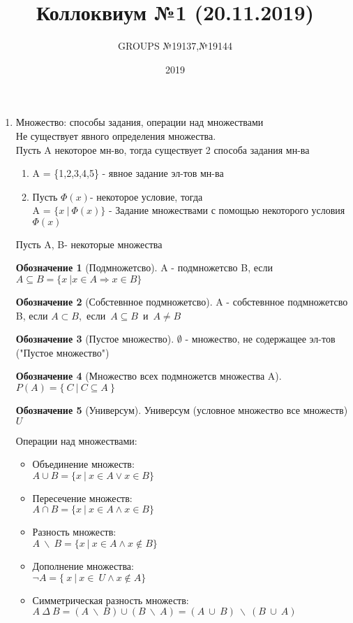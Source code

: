 \documentclass{article}
\title{ Коллоквиум №1 (20.11.2019) }
\author{GROUPS №19137,№19144}
\date{2019\\}
\theoremstyle{definition}
\newtheorem*{name}{Обозначение}
\begin{document}
  \maketitle
  \begin{enumerate}
    \item Множество: способы задания, операции над множествами
    \\ Не существует явного определения множества.
    \\ Пусть A некоторое мн-во, тогда существует 2 способа задания мн-ва
          \begin{enumerate}
          \item A = \{1,2,3,4,5\} - явное задание эл-тов мн-ва \\
          \item Пусть $\Phi(x)$- некоторое условие, тогда \\A = $\{x \ | \ \Phi(x) \}$ - Задание множествами с помощью некоторого условия $\Phi(x)$
          \end{enumerate}
      Пусть A, B- некоторые множества \\
      \begin{name}[Подмножетсво]
        A - подмножетсво B, если
        \mbox{$A \subseteq B = \{x \ | x\in{A} \Rightarrow x\in{B} \}$}
      \end{name}
      \begin{name}[Собстевнное подмножетсво]
        A - собстевнное подмножетсво B, если
        \mbox{$A \subset B$, если $A \subseteq B$ и $A\ne{B} $}
      \end{name}
      \begin{name}[Пустое множество]
        $\emptyset$ - множество, не содержащее эл-тов ("Пустое множество")
      \end{name}
      \begin{name}[Множество всех подмножетсв множества A]
        \mbox{$P(A) = \{ \ C\ |\ C \subseteq{A} \ \} $}
      \end{name}
      \begin{name}[Универсум]
          Универсум (условное множество все множеств) $U$
      \end{name}
      Операции над множествами:
      \begin{itemize}
        \item Объединение множеств:
        \\ $A\cup{B} = \{ x \ | \ x \in{A} \lor x\in{B}\}$
        \item Пересечение множеств:
        \\ $A\cap{B} = \{ x \ | \ x \in{A} \land x\in{B}\}$
        \item Разность множеств:
        \\ $A \ \backslash\  B = \{x\ | \ x\in{A} \land x\notin{B} \}$
        \item Дополнение множества:
        \\ $\neg{A} = \{\ x\ |\ x \in{\ U} \land{x \notin{A}}\} $
        \item Симметрическая разность множеств:
        \\ $A \ \Delta \ B = (A \  \backslash \ B) \cup{(B \ \backslash{\ A})} = (A\ \cup{\ B })\ \backslash \ (B\ \cup{\ A } ) $


\end{itemize}
\end{enumerate}
\end{document}
